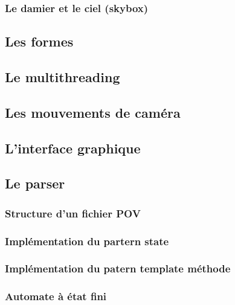 \documentclass[11pt]{article}
\begin{document}
        \subsubsection{Le damier et le ciel (skybox)}
            \label{checkerboardSkybox}

            

    \subsection{Les formes}
	

    \subsection{Le multithreading}

        

    \subsection{Les mouvements de caméra}
        \label{mouvementsCamera}

        

    \subsection{L'interface graphique}

    

    \subsection{Le parser}
        \subsubsection{Structure d'un fichier POV}
        \subsubsection{Implémentation du partern state}
        \subsubsection{Implémentation du patern template méthode}
        \subsubsection{Automate à état fini}
\end{document}
